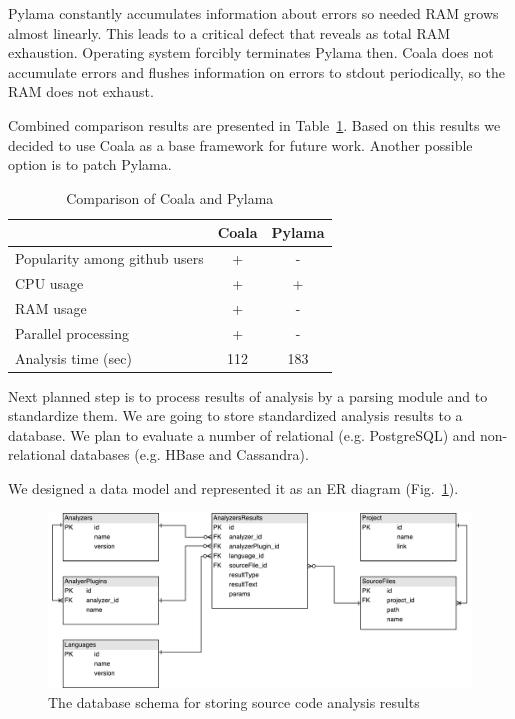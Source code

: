 Pylama constantly accumulates information about errors so needed RAM grows
almost linearly. This leads to a critical defect that reveals as total RAM
exhaustion. Operating system forcibly terminates Pylama then. Coala does not
accumulate errors and flushes information on errors to stdout periodically, so
the RAM does not exhaust.

Combined comparison results are presented in Table~\ref{tab:compare}. Based on
this results we decided to use Coala as a base framework for future work.
Another possible option is to patch Pylama.

\begin{table}
  \caption{Comparison of Coala and Pylama}
  \label{tab:compare}
  \begin{tabular}{lcc}
    \toprule
    ~                              &Coala&Pylama\\
    \midrule
    Popularity among github users  & +     & -      \\ \hline
	CPU usage                      & +    & +      \\ \hline
	RAM usage                      & +    & -      \\ \hline
	Parallel processing            & +     & -      \\ \hline
	Analysis time (sec)            & 112   & 183      \\ \hline
  \bottomrule
\end{tabular}
\end{table}

Next planned step is to process results of analysis by a parsing module
and to standardize them. We are going to store standardized analysis results to
a database. We plan to evaluate a number of relational (e.g. PostgreSQL) and
non-relational databases (e.g. HBase and Cassandra).

We designed a data model and represented it as an ER diagram (Fig.~\ref{fig:dbscheme}).

\begin{figure}[h]
	\centering
	\includegraphics[width=1\linewidth]{dbscheme}
	\caption{The database schema for storing source code analysis results}
	\label{fig:dbscheme}
\end{figure}

